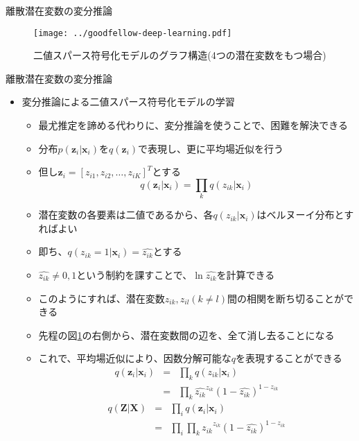 \documentclass[dvipdfmx,notheorems,t]{beamer}
\begin{document}
\begin{frame}{離散潜在変数の変分推論}

\begin{figure}[h]
	\centering
	\texttt{[image: ../goodfellow-deep-learning.pdf]}
	\caption{二値スパース符号化モデルのグラフ構造(4つの潜在変数をもつ場合)}
	\label{fig:graph-structure-of-binary-sparse-coding-model}
\end{figure}

\end{frame}

\begin{frame}{離散潜在変数の変分推論}

\begin{itemize}
	\item 変分推論による二値スパース符号化モデルの学習
	\begin{itemize}
		\item 最尤推定を諦める代わりに、変分推論を使うことで、困難を解決できる
		\item 分布$p(\bm{z}_i | \bm{x}_i)$を$q(\bm{z}_i)$で表現し、更に平均場近似を行う
		\item 但し$\bm{z}_i = \left[ z_{i1}, z_{i2}, \ldots, z_{iK} \right]^T$とする
		\begin{equation}
			q(\bm{z}_i | \bm{x}_i) = \prod_k q(z_{ik} | \bm{x}_i)
		\end{equation}
		
		\item 潜在変数の各要素は二値であるから、各$q(z_{ik} | \bm{x}_i)$は\alert{ベルヌーイ分布}とすればよい
		\item 即ち、\color{red}$q(z_{ik} = 1 | \bm{x}_i) = \widehat{z_{ik}}$\normalcolor とする
		\item $\widehat{z_{ik}} \neq 0, 1$という制約を課すことで、$\ln \widehat{z_{ik}}$を計算できる
		\newline
		\item このようにすれば、潜在変数$z_{ik}, z_{il} (k \neq l)$間の\alert{相関を断ち切る}ことができる
		\item 先程の図\ref{fig:graph-structure-of-binary-sparse-coding-model}の右側から、潜在変数間の辺を、全て消し去ることになる
		
		\item これで、平均場近似により、因数分解可能な$q$を表現することができる
		\begin{eqnarray}
			q(\bm{z}_i | \bm{x}_i) &=& \prod_k q(z_{ik} | \bm{x}_i) \\
			&=& \prod_k \widehat{z_{ik}}^{z_{ik}} \left( 1 - \widehat{z_{ik}} \right)^{1 - z_{ik}}
		\end{eqnarray}
		\begin{eqnarray}
			q(\bm{Z} | \bm{X}) &=& \prod_i q(\bm{z}_i | \bm{x}_i) \\
			&=& \prod_i \prod_k \widehat{z_{ik}}^{z_{ik}} \left( 1 - \widehat{z_{ik}} \right)^{1 - z_{ik}}
		\end{eqnarray}
		

\end{itemize}
\end{itemize}
\end{frame}
\end{document}
